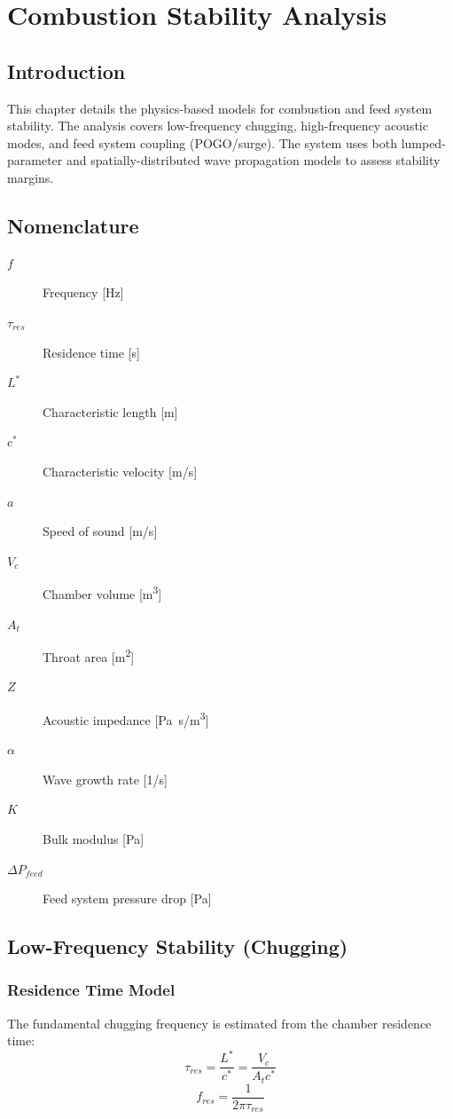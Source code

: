 \section{Combustion Stability Analysis}

\subsection{Introduction}
This chapter details the physics-based models for combustion and feed system stability. The analysis covers low-frequency chugging, high-frequency acoustic modes, and feed system coupling (POGO/surge). The system uses both lumped-parameter and spatially-distributed wave propagation models to assess stability margins.

\subsection{Nomenclature}
\begin{description}
    \item[\(f\)] Frequency [\si{Hz}]
    \item[\(\tau_{res}\)] Residence time [\si{s}]
    \item[\(L^*\)] Characteristic length [\si{m}]
    \item[\(c^*\)] Characteristic velocity [\si{m/s}]
    \item[\(a\)] Speed of sound [\si{m/s}]
    \item[\(V_c\)] Chamber volume [\si{m^3}]
    \item[\(A_t\)] Throat area [\si{m^2}]
    \item[\(Z\)] Acoustic impedance [\si{Pa.s/m^3}]
    \item[\(\alpha\)] Wave growth rate [\si{1/s}]
    \item[\(K\)] Bulk modulus [\si{Pa}]
    \item[\(\Delta P_{feed}\)] Feed system pressure drop [\si{Pa}]
\end{description}

\subsection{Low-Frequency Stability (Chugging)}

\subsubsection{Residence Time Model}
The fundamental chugging frequency is estimated from the chamber residence time:
\begin{equation}
\tau_{res} = \frac{L^*}{c^*} = \frac{V_c}{A_t c^*}
\end{equation}
\begin{equation}
f_{res} = \frac{1}{2\pi \tau_{res}}
\end{equation}

